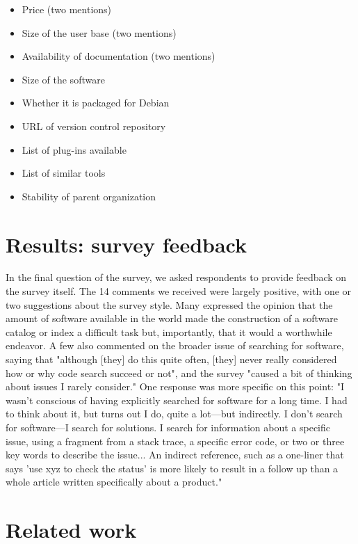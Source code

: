 \documentclass{casicswhitepaper}
\begin{document}
\begin{itemize}[itemsep=-0.5ex]

\item Price (two mentions)
\item Size of the user base (two mentions)
\item Availability of documentation (two mentions)
\item Size of the software
\item Whether it is packaged for Debian
\item URL of version control repository
\item List of plug-ins available
\item List of similar tools
\item Stability of parent organization

\end{itemize}


\section{Results: survey feedback}

In the final question of the survey, we asked respondents to provide feedback on the survey itself.  The 14 comments we received were largely positive, with one or two suggestions about the survey style. Many expressed the opinion that the amount of software available in the world made the construction of a software catalog or index a difficult task but, importantly, that it would a worthwhile endeavor. A few also commented on the broader issue of searching for software, saying that "although [they] do this quite often, [they] never really considered how or why code search succeed or not", and the survey "caused a bit of thinking about issues I rarely consider." One response was more specific on this point: "I wasn't conscious of having explicitly searched for software for a long time. I had to think about it, but turns out I do, quite a lot---but indirectly. I don't search for software---I search for solutions. I search for information about a specific issue, using a fragment from a stack trace, a specific error code, or two or three key words to describe the issue... An indirect reference, such as a one-liner that says 'use xyz to check the status' is more likely to result in a follow up than a whole article written specifically about a product."


\section{Related work}
\end{document}

